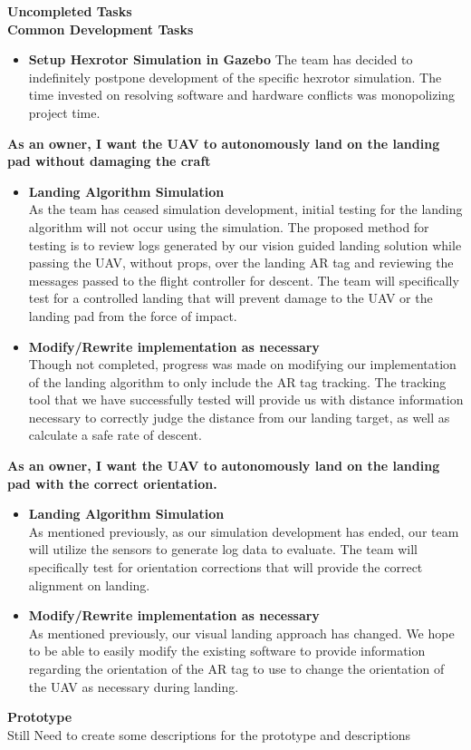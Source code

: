 \vspace{5mm}
\noindent\Large{\textbf{Uncompleted Tasks}}\\
\vspace{4mm}
\noindent \large{\textbf{Common Development Tasks}}
\normalsize
\begin{itemize}
\item \textbf{Setup Hexrotor Simulation in Gazebo}
The team has decided to indefinitely postpone development of the specific hexrotor simulation. The time invested on resolving software and hardware conflicts was monopolizing project time.
\end{itemize} 

\vspace{3mm}
\noindent \large{\textbf{As an owner, I want the UAV to autonomously land on the landing pad without damaging the craft}}
\normalsize
\begin{itemize}
\item \textbf{Landing Algorithm Simulation}\\
As the team has ceased simulation development, initial testing for the landing algorithm will not occur using the simulation. The proposed method for testing is to review logs generated by our vision guided landing solution while passing the UAV, without props, over the landing AR tag and reviewing the messages passed to the flight controller for descent. The team will specifically test for a controlled landing that will prevent damage to the UAV or the landing pad from the force of impact.
\item \textbf{Modify/Rewrite implementation as necessary}\\
Though not completed, progress was made on modifying our implementation of the landing algorithm to only include the AR tag tracking. The tracking tool that we have successfully tested will provide us with distance information necessary to correctly judge the distance from our landing target, as well as calculate a safe rate of descent.
\end{itemize}



\vspace{3mm}
\noindent \large{\textbf{As an owner, I want the UAV to autonomously land on the landing pad with the correct orientation.}}
\normalsize
\begin{itemize}
\item \textbf{Landing Algorithm Simulation}\\
As mentioned previously, as our simulation development has ended, our team will utilize the sensors to generate log data to evaluate. The team will specifically test for orientation corrections that will provide the correct alignment on landing.
\item \textbf{Modify/Rewrite implementation as necessary}\\
As mentioned previously, our visual landing approach has changed. We hope to be able to easily modify the existing software to provide information regarding the orientation of the AR tag to use to change the orientation of the UAV as necessary during landing.
\end{itemize}

\vspace{6mm}
\noindent\Large{\textbf{Prototype}}\\
\normalsize
Still Need to create some descriptions for the prototype and descriptions
